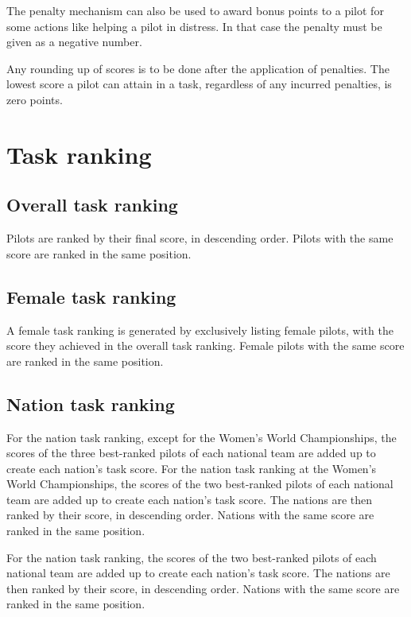 \documentclass{article}
\begin{document}
The penalty mechanism can also be used to award bonus points to a pilot for
some actions like helping a pilot in distress. In that case the penalty must be
given as a negative number.

Any rounding up of scores is to be done after the application of penalties. The
lowest score a pilot can attain in a task, regardless of any incurred
penalties, is zero points.

\newpage
\section{Task ranking}
\label{sec:task-ranking}
\subsection{Overall task ranking}
Pilots are ranked by their final score, in descending order. Pilots with the
same score are ranked in the same position.

\subsection{Female task ranking}
A female task ranking is generated by exclusively listing female pilots, with
the score they achieved in the overall task ranking. Female pilots with the
same score are ranked in the same position.

\subsection{Nation task ranking}
\begin{hg}
For the nation task ranking, except for the Women’s World Championships, the
scores of the three best-ranked pilots of each national team are added up to
create each nation’s task score. For the nation task ranking at the Women’s
World Championships, the scores of the two best-ranked pilots of each national
team are added up to create each nation’s task score. The nations are then
ranked by their score, in descending order. Nations with the same score are
ranked in the same position.
\end{hg}

\begin{pg}
For the nation task ranking, the scores of the two best-ranked pilots of each
national team are added up to create each nation’s task score. The nations are
then ranked by their score, in descending order. Nations with the same score
are ranked in the same position.
\end{pg}
\end{document}
